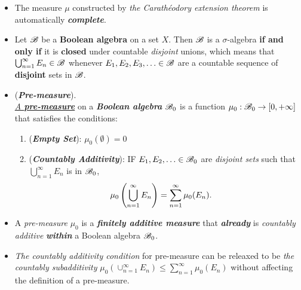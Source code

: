 \documentclass[11pt]{article}
\begin{document}
\begin{itemize}
\item \begin{remark}
The measure $\mu$ constructed by \emph{the Carath\'eodory extension theorem} is automatically \emph{\textbf{complete}}.
\end{remark}

\item \begin{proposition}
Let ${\mathscr B}$ be a \textbf{Boolean algebra} on a set $X$. Then ${\mathscr B}$ is a $\sigma$-algebra \textbf{if and only if} it is \textbf{closed} under countable \emph{disjoint}
unions, which means that $\bigcup_{n=1}^{\infty} E_n \in {\mathscr B}$ whenever $E_1, E_2, E_3, \ldots \in {\mathscr B}$ are a countable sequence of \textbf{disjoint} sets in ${\mathscr B}$.
\end{proposition}

\item \begin{definition}  (\emph{\textbf{Pre-measure}}). \\
\underline{\emph{A \textbf{pre-measure}}} on a \emph{\textbf{Boolean algebra}} ${\mathscr B}_{0}$  is a function $\mu_0 : {\mathscr B}_0 \rightarrow [0, +\infty]$ that satisfies the conditions:
\begin{enumerate}
\item (\textbf{\emph{Empty Set}}): $\mu_0(\emptyset) = 0$
\item (\textbf{\emph{Countably Additivity}}): IF $E_1, E_2, \ldots \in {\mathscr B}_0$ are \emph{disjoint sets} such that $\bigcup_{n=1}^{\infty} E_n$ is in ${\mathscr B}_0$,
 \begin{align*}
\mu_0\left(\bigcup_{n=1}^{\infty} E_n\right) &= \sum_{n=1}^{\infty} \mu_0(E_n).
\end{align*} 
\end{enumerate} 
\end{definition}

\item \begin{remark}
A \emph{pre-measure} $\mu_0$ is a \emph{\textbf{finitely additive measure}} that \emph{\textbf{already}} is \emph{countably additive} \emph{\textbf{within}} a Boolean algebra ${\mathscr B}_0$. 
\end{remark}

\item \begin{remark}
\emph{The countably additivity condition} for pre-measure can be releaxed to be \emph{the countably subadditivity} $\mu_0(\cup_{n=1}^{\infty} E_n) \le \sum_{n=1}^{\infty} \mu_0(E_n)$ without affecting the definition of a pre-measure.
\end{remark}


\end{itemize}
\end{document}
